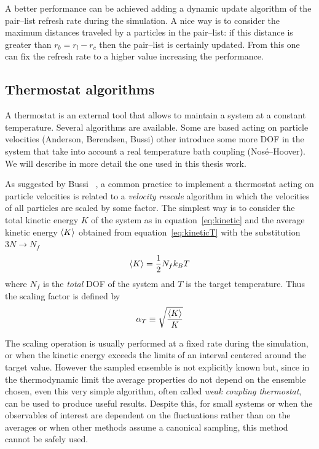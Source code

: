 A better performance can be achieved adding a dynamic update algorithm of the pair--list refresh rate during the simulation. A nice way is to consider the maximum distances traveled by a particles in the pair--list: if this distance is greater than $r_b = r_l - r_c$ then the pair--list is certainly updated. From this one can fix the refresh rate to a higher value increasing the performance.

\subsection{Thermostat algorithms} %
A thermostat is an external tool that allows to maintain a system at a constant temperature.
Several algorithms are available. Some are based acting on particle velocities (Anderson, Berendsen, Bussi) other 
introduce some more \ac{DOF} in the system that take into account a real temperature bath coupling 
(Nosé--Hoover). We will describe in more detail the one used in this thesis work.

As suggested by Bussi \etal\, \cite{Bussi}, a common practice to implement a thermostat acting on particle 
velocities is related to a \textit{velocity rescale} algorithm in which the velocities of all particles are 
scaled by some factor. The simplest way is to consider the total kinetic energy $K$ of the system as in 
equation~\eqref{eq:kinetic} and the average kinetic energy $\left \langle K \right \rangle$ obtained from equation~\eqref{eq:kineticT} 
with the substitution $3N\rightarrow N_f$
\begin{equation*}
	\left \langle K \right \rangle = \frac{1}{2}N_f k_B T
\end{equation*}
where $N_f$ is the \textit{total} \ac{DOF} of the system and $T$ is the target temperature. Thus the scaling 
factor is defined by
\begin{equation*}
	\alpha_{T} \equiv \sqrt{\frac{\left \langle K \right \rangle}{K}}
\end{equation*}

The scaling operation is usually performed at a fixed rate during the simulation, or when the kinetic energy 
exceeds the limits of an interval centered around the target value. However the sampled ensemble is not 
explicitly known but, since in the thermodynamic limit the average properties do not depend on the ensemble 
chosen, even this very simple algorithm, often called \textit{weak coupling thermostat}, can be used to produce 
useful results. Despite this, for small systems or when the observables of interest are dependent on the 
fluctuations rather than on the averages or when other methods assume a canonical sampling, this method cannot be 
safely used.

